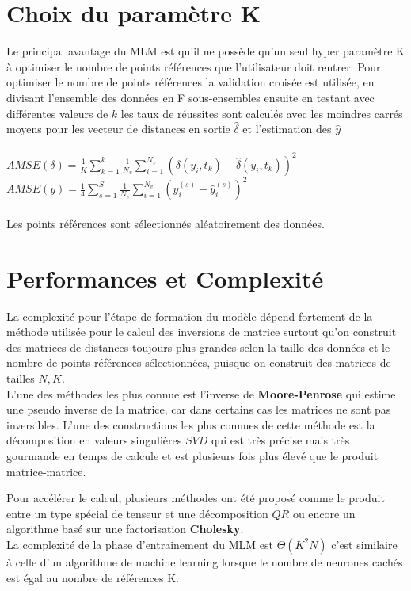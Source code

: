 \documentclass[12pt,a4paper]{report}
\begin{document}
{\color{MidnightBlue}\section{Choix du paramètre K}}
\par Le principal avantage du MLM est qu'il ne possède qu'un seul hyper paramètre K à optimiser le nombre de points références que l'utilisateur doit rentrer. Pour optimiser le nombre de points références la validation croisée est utilisée, en divisant l'ensemble des données en F sous-ensembles ensuite en testant avec différentes valeurs de $k$ les taux de réussites sont calculés avec les moindres carrés moyens pour les vecteur de distances en sortie $\hat{\delta}$ et l'estimation des $\hat{y}$\\ \\
$AMSE(\delta) = \frac{1}{K} \sum_{k=1}^k \frac{1}{N_v} \sum_{i=1}^{N_v} (\delta(y_i,t_k) - \hat{\delta}(y_i,t_k))^2$ \\
$AMSE(y)=\frac{1}{4} \sum_{s = 1}^S \frac{1}{N_v} \sum_{i = 1}^{N_v} (y_i^{(s)} -\hat{y}_i^{(s)})^2$\\\\
Les points références sont sélectionnés aléatoirement des données. 

{\color{MidnightBlue}\section{Performances et Complexité}}
\par La complexité pour l'étape de formation du modèle  dépend fortement de la méthode utilisée pour le calcul des inversions de matrice surtout qu'on construit des matrices de distances toujours plus grandes selon la taille des données et le nombre de points références sélectionnées, puisque on construit des matrices de tailles $N,K$.\\
L'une des méthodes les plus connue est l'inverse de \textbf{Moore-Penrose} qui estime une pseudo inverse de la matrice, car dans certains cas les matrices ne sont pas inversibles. L'une des constructions les plus connues de cette méthode est la décomposition en valeurs singulières $SVD$ qui est très précise mais très gourmande en temps de calcule et est plusieurs fois plus élevé  que le produit matrice-matrice.\\
\par Pour accélérer le calcul, plusieurs méthodes ont été proposé comme le produit entre un type spécial de tenseur et une décomposition $QR$ ou encore un algorithme basé sur une factorisation \textbf{Cholesky}.\\
La complexité de la phase d'entrainement du MLM est $\Theta (K^2N)$ c'est similaire à celle d'un algorithme de machine learning lorsque le nombre de neurones cachés est égal au nombre de références K.
\end{document}
